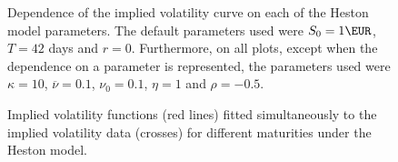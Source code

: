 \begin{figure}[H]
  \begin{subfigmatrix}{2}
  \end{subfigmatrix}
  \caption[Dependence of the implied volatility curve on each of the Heston model parameters.]{Dependence of the implied volatility curve on each of the Heston model parameters. The default parameters used were $S_0=1\EUR$, $T=42$ days and $r=0$. Furthermore, on all plots, except when the dependence on a parameter is represented, the parameters used were $\kappa=10$, $\overline{\nu}=0.1$, $\nu_0=0.1$, $\eta=1$ and $\rho=-0.5$.}
  \label{fig:Hparam}
\end{figure}


\begin{figure}[H]
  \begin{subfigmatrix}{2}
  \end{subfigmatrix}
  \caption[Implied volatility functions fitted simultaneously to the implied volatility data for different maturities under the Heston model.]{Implied volatility functions (red lines) fitted simultaneously to the implied volatility data (crosses) for different maturities under the Heston model.}
  \label{fig:H}
\end{figure}




